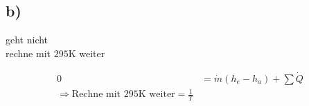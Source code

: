 

\subsection*{b)}
geht nicht \\
rechne mit $295 \text{K}$ weiter

\begin{align*}
0 &= \dot{m} (h_e - h_a) + \sum \dot{Q} \\
\Rightarrow \text{Rechne mit } 295 \text{K} \text{ weiter} = \frac{1}{T}
\end{align*}